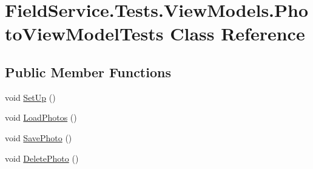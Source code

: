 \hypertarget{class_field_service_1_1_tests_1_1_view_models_1_1_photo_view_model_tests}{\section{Field\+Service.\+Tests.\+View\+Models.\+Photo\+View\+Model\+Tests Class Reference}
\label{class_field_service_1_1_tests_1_1_view_models_1_1_photo_view_model_tests}
}
\subsection*{Public Member Functions}
\begin{DoxyCompactItemize}
\item 
void \hyperlink{class_field_service_1_1_tests_1_1_view_models_1_1_photo_view_model_tests_a0fa78a1404abc0de71ad45b2fbf192bb}{Set\+Up} ()
\item 
void \hyperlink{class_field_service_1_1_tests_1_1_view_models_1_1_photo_view_model_tests_a9973fad7d9176d7ebe5995b6b30ea81f}{Load\+Photos} ()
\item 
void \hyperlink{class_field_service_1_1_tests_1_1_view_models_1_1_photo_view_model_tests_a5fac89618ebce00646b0fb454c82b8c6}{Save\+Photo} ()
\item 
void \hyperlink{class_field_service_1_1_tests_1_1_view_models_1_1_photo_view_model_tests_ac4c25eca107401f4c0f0a8dc00401275}{Delete\+Photo} ()
\end{DoxyCompactItemize}


